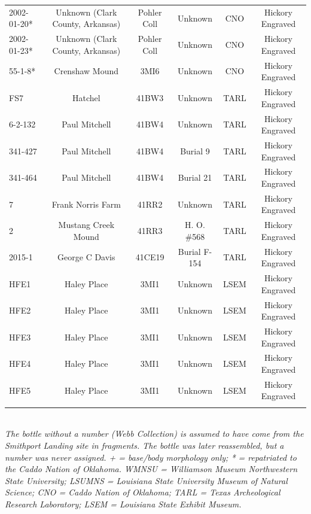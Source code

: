 \documentclass[review]{elsarticle}
\begin{document}
\begin{table}[htbp]
\begin{tabular}{lccccC}
2002-01-20* & Unknown (Clark County, Arkansas) & Pohler Coll & Unknown & CNO & Hickory Engraved\\
2002-01-23* & Unknown (Clark County, Arkansas) & Pohler Coll & Unknown & CNO & Hickory Engraved\\
55-1-8* & Crenshaw Mound & 3MI6 & Unknown & CNO & Hickory Engraved\\
FS7 & Hatchel & 41BW3 & Unknown & TARL & Hickory Engraved\\
6-2-132 & Paul Mitchell & 41BW4 & Unknown & TARL & Hickory Engraved\\
341-427 & Paul Mitchell & 41BW4 & Burial 9 & TARL & Hickory Engraved\\
341-464 & Paul Mitchell & 41BW4 & Burial 21 & TARL & Hickory Engraved\\
7 & Frank Norris Farm & 41RR2 & Unknown & TARL & Hickory Engraved\\
2 & Mustang Creek Mound & 41RR3 & H. O. \#568 & TARL & Hickory Engraved\\
2015-1 & George C Davis & 41CE19 & Burial F-154 & TARL & Hickory Engraved\\
HFE1 & Haley Place & 3MI1 & Unknown & LSEM & Hickory Engraved\\
HFE2 & Haley Place & 3MI1 & Unknown & LSEM & Hickory Engraved\\
HFE3 & Haley Place & 3MI1 & Unknown & LSEM & Hickory Engraved\\
HFE4 & Haley Place & 3MI1 & Unknown & LSEM & Hickory Engraved\\
HFE5 & Haley Place & 3MI1 & Unknown & LSEM & Hickory Engraved\\
\bottomrule\\
\end{tabular}\\
\textit{The bottle without a number (Webb Collection) is assumed to have come from the Smithport Landing site in fragments. The bottle was later reassembled, but a number was never assigned. + = base/body morphology only; * = repatriated to the Caddo Nation of Oklahoma. WMNSU = Williamson Museum Northwestern State University; LSUMNS = Louisiana State University Museum of Natural Science; CNO = Caddo Nation of Oklahoma; TARL = Texas Archeological Research Laboratory; LSEM = Louisiana State Exhibit Museum.}
\label{tab:Tbl1}
\end{table}
\end{document}
